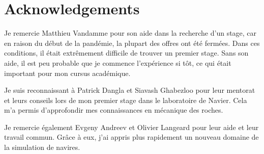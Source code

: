 \documentclass[12pt]{article}
\begin{document}


\section*{\centering Acknowledgements}
\setcounter{page}{2}

Je remercie Matthieu Vandamme pour son aide dans la recherche d'un stage, car en raison du début de la pandémie, la plupart des offres ont été fermées. Dans ces conditions, il était extrêmement difficile de trouver un premier stage. Sans son aide, il est peu probable que je commence l'expérience si tôt, ce qui était important pour mon cursus académique.

Je suis reconnaissant à Patrick Dangla et Siavash Ghabezloo pour leur mentorat et leurs conseils lors de mon premier stage dans le laboratoire de Navier. Cela m'a permis d'approfondir mes connaissances en mécanique des roches.

Je remercie également Evgeny Andreev et Olivier Langeard pour leur aide et leur travail commun. Grâce à eux, j'ai appris plus rapidement un nouveau domaine de la simulation de navires.

\newpage
\end{document}
